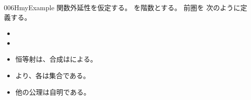 \documentclass[index]{subfiles}
\begin{document}
\begin{myBlock}{006H}{myExample}
  関数外延性を仮定する。
  を階数とする。
  前圏を
  次のように定義する。
  \begin{itemize}
  \item {}
  \item {}
  \item 恒等射は、合成はによる。
  \item {}より、各は集合である。
  \item 他の公理は自明である。
  \end{itemize}
\end{myBlock}
\end{document}
